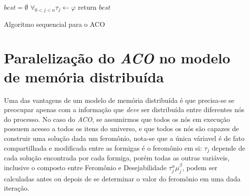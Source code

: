 \begin{algorithm}[ht]
	
	$best = \emptyset$\;
	$\forall_{0<j<n} \tau_j \gets \varphi$\;
	return $best$\;
	\caption{Algoritmo sequencial para o ACO}
	\label{acoseq}
\end{algorithm} 

\section{Paralelização do \textit{ACO} no modelo de memória distribuída}
Uma das vantagens de um modelo de memória distribuída é que precisa-se se preocupar apenas com a informação que \textit{deve} ser distribuída entre diferentes nós do processo. No caso do \textit{ACO}, se assumirmos que todos os nós em execução possuem acesso a todos os itens do universo, e que todos os nós são capazes de construir uma solução dada um feromônio, nota-se que a única váriavel é de fato compartilhada e modificada entre as formigas é o feromônio em si: $\tau_j$ depende de cada solução encontrada por cada formiga, porém todas as outras variáveis, inclusive o composto entre Feromônio e Desejabilidade $\tau_j^\alpha \mu_j^\beta$, podem ser calculadas antes ou depois de se determinar o valor do feromônio em uma dada iteração.

